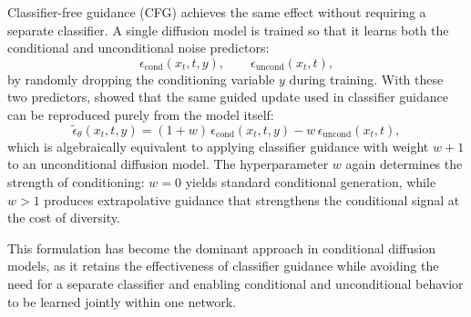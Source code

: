 Classifier-free guidance (CFG) \citep{ho2022classifier} achieves the same effect without requiring a
separate classifier.  
A single diffusion model is trained so that it learns both the conditional and unconditional noise
predictors:
\[
\epsilon_{\mathrm{cond}}(x_t,t,y), \qquad
\epsilon_{\mathrm{uncond}}(x_t,t),
\]
by randomly dropping the conditioning variable $y$ during training.  
With these two predictors, \citet{ho2022classifier} showed that the same guided update used in
classifier guidance can be reproduced purely from the model itself:
\begin{equation}
\tilde{\epsilon}_\theta(x_t,t,y)
=
(1+w)\,\epsilon_{\mathrm{cond}}(x_t,t,y)
-
w\,\epsilon_{\mathrm{uncond}}(x_t,t),
\label{eq:guided_eps_cfg}
\end{equation}
which is algebraically equivalent to applying classifier guidance with weight $w+1$ to an
unconditional diffusion model.  
The hyperparameter $w$ again determines the strength of conditioning: $w=0$ yields standard
conditional generation, while $w>1$ produces extrapolative guidance that strengthens the conditional
signal at the cost of diversity.

This formulation has become the dominant approach in conditional diffusion models, as it retains the
effectiveness of classifier guidance while avoiding the need for a separate classifier and enabling
conditional and unconditional behavior to be learned jointly within one network.
